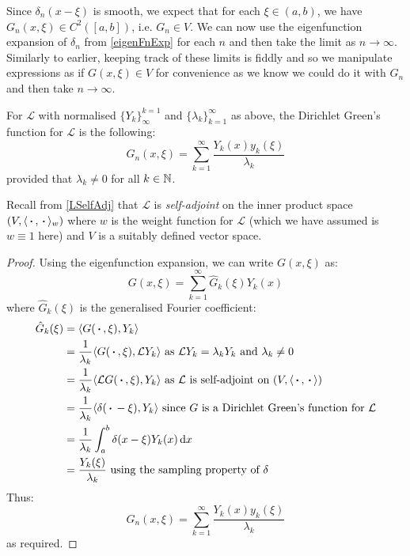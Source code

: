 \documentclass[../main.tex]{subfiles}
\begin{document}
Since $\delta_n(x - \xi)$ is smooth, we expect that for each $\xi \in (a, b)$, we have $G_n(x, \xi) \in C^2([a, b])$, i.e. $G_n \in V$.
We can now use the eigenfunction expansion of $\delta_n$ from \cref{eigenFnExp} for each $n$ and then take the limit as $n \to \infty$.
Similarly to earlier, keeping track of these limits is fiddly and so we manipulate expressions as if $G(x, \xi) \in V$ for convenience as we know we could do it with $G_n$ and then take $n \to \infty$.
\begin{proposition}
  For $\mathcal{L}$ with normalised $\{Y_k\}^{k = 1}_{\infty}$ and $\{\lambda_k\}_{k = 1}^{\infty}$ as above, the Dirichlet Green's function for $\mathcal{L}$ is the following:
  \[
    G_n(x, \xi) = \sum_{k = 1}^{\infty} \frac{Y_k(x) y_k(\xi)}{\lambda_k}
  \]
  provided that $\lambda_k \neq 0$ for all $k \in \mathbb{N}$.
\end{proposition}
\begin{remark}[Recap]
  Recall from \cref{LSelfAdj} that $\mathcal{L}$ is \textit{self-adjoint} on the inner product space $(V, \langle {\hspace{0.18em}\boldsymbol{\cdot}\hspace{0.18em}}, {\hspace{0.18em}\boldsymbol{\cdot}\hspace{0.18em}} \rangle_w)$ where $w$ is the weight function for $\mathcal{L}$ (which we have assumed is $w \equiv 1$ here) and $V$ is a suitably defined vector space.
\end{remark}
\begin{proof}
  Using the eigenfunction expansion, we can write $G(x, \xi)$ as:
  \[
    G(x, \xi) = \sum_{k = 1}^{\infty} \hat{G}_k(\xi) Y_k(x)
  \]
  where $\hat{G}_k(\xi)$ is the generalised Fourier coefficient:
  \begin{align*}
    \hat{G}_{k}(\xi) &= \langle G(\argdot, \xi), Y_k \rangle \\
                     &= \frac{1}{\lambda_k} \langle G(\argdot, \xi), \mathcal{L}Y_k \rangle \text{ as $\mathcal{L} Y_k = \lambda_k Y_k$ and $\lambda_k \neq 0$} \\
                     &= \frac{1}{\lambda_k} \langle \mathcal{L}G(\argdot, \xi), Y_k \rangle \text{ as $\mathcal{L}$ is self-adjoint on $(V, \langle \argdot, \argdot \rangle)$} \\
                     &= \frac{1}{\lambda_k} \langle \delta(\argdot - \xi), Y_k \rangle \text{ since $G$ is a Dirichlet Green's function for $\mathcal{L}$} \\
                     &= \frac{1}{\lambda_k} \int_{a}^{b} \delta(x - \xi) Y_k(x) \d{x} \\
                     &= \frac{Y_k(\xi)}{\lambda_k} \text{ using the sampling property of $\delta$}
  \end{align*}
  Thus:
  \[
    G_n(x, \xi) = \sum_{k = 1}^{\infty} \frac{Y_k(x) y_k(\xi)}{\lambda_k}
  \]
  as required.
\end{proof}
\end{document}
